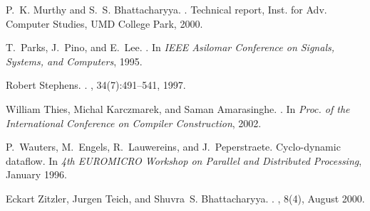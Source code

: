 \documentclass{sig-alt-full}
\begin{document}
{\begin{thebibliography}{10}
P.~K. Murthy and S.~S. Bhattacharyya.
.
\newblock Technical report, Inst. for Adv. Computer Studies, UMD College Park,
  2000.

T.~Parks, J.~Pino, and E.~Lee.
.
\newblock In {\em IEEE Asilomar Conference on Signals, Systems, and Computers},
  1995.

Robert Stephens.
.
, 34(7):491--541, 1997.

William Thies, Michal Karczmarek, and Saman Amarasinghe.
.
\newblock In {\em {Proc. of the International Conference on Compiler
  Construction}}, 2002.

P.~Wauters, M.~Engels, R.~Lauwereins, and J.~Peperstraete.
\newblock Cyclo-dynamic dataflow.
\newblock In {\em 4th EUROMICRO Workshop on Parallel and Distributed
  Processing}, January 1996.

Eckart Zitzler, Jurgen Teich, and Shuvra~S. Bhattacharyya.
.
,
  8(4), August 2000.

\end{thebibliography}
}
%

%
\end{document}
